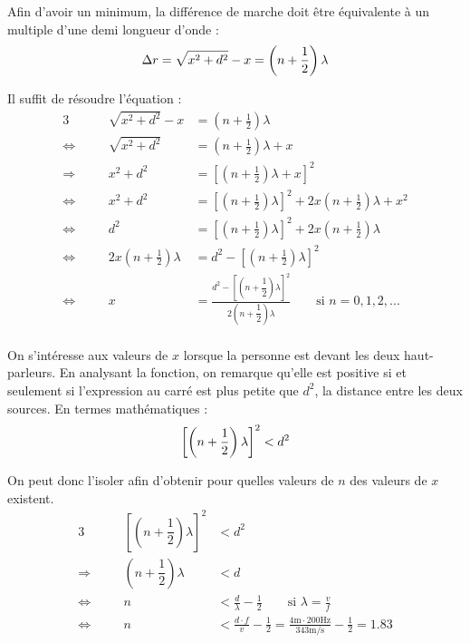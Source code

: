 \documentclass[11pt]{article}
\numberwithin{equation}{section}
\begin{document}
Afin d'avoir un minimum, la différence de marche doit être équivalente à un multiple d'une demi longueur d'onde :
\begin{equation*}
	\Delta r=\sqrt{x^2+d^2}-x=\left (n+\frac{1}{2}\right )\lambda\\
\end{equation*}

Il suffit de résoudre l'équation :
\begin{alignat*}{3}
	                     & & \sqrt{x^2+d^2}-x&=\left (n+\frac{1}{2}\right )\lambda\\
	\Leftrightarrow\quad & & \sqrt{x^2+d^2}  &=\left (n+\frac{1}{2}\right )\lambda+x\\
	\Rightarrow\quad     & &       x^2+d^2   &=\left [\left (n+\frac{1}{2}\right )\lambda+x\right ]^2\\
    \Leftrightarrow\quad & &       x^2+d^2   &=\left [\left (n+\frac{1}{2}\right )\lambda\right ]^2+2x\left (n+\frac{1}{2}\right )\lambda+x^2\\
    \Leftrightarrow\quad & &       d^2       &=\left [\left (n+\frac{1}{2}\right )\lambda\right ]^2+2x\left (n+\frac{1}{2}\right )\lambda\\
    \Leftrightarrow\quad & & 2x\left (n+\frac{1}{2}\right )\lambda&=d^2-\left [\left (n+\frac{1}{2}\right )\lambda\right ]^2\\
    \Leftrightarrow\quad & & x &=\frac{d^2-\left [\left (n+\dfrac{1}{2}\right )\lambda\right ]^2}{2\left (n+\dfrac{1}{2}\right )\lambda}\quad\quad\text{si $n=0,1,2,...$}\\
\end{alignat*}

On s'intéresse aux valeurs de $x$ lorsque la personne est devant les deux haut-parleurs. En analysant la fonction, on remarque qu'elle est positive si et seulement si l'expression au carré est plus petite que $d^2$, la distance entre les deux sources. En termes mathématiques :
\begin{equation*}
	\left [\left (n+\dfrac{1}{2}\right )\lambda\right ]^2<d^2\\
\end{equation*}

On peut donc l'isoler afin d'obtenir pour quelles valeurs de $n$ des valeurs de $x$ existent.
\begin{alignat*}{3}
	                     & & \left [\left (n+\dfrac{1}{2}\right )\lambda\right ]^2&<d^2\\
	\Rightarrow\quad     & &        \left (n+\dfrac{1}{2}\right )\lambda          &<d\\
	\Leftrightarrow\quad & &               n                                      &<\frac{d}{\lambda}-\frac{1}{2}\quad\quad\text{si $\lambda=\frac{v}{f}$}\\
	\Leftrightarrow\quad & &               n                                      &<\frac{d\cdot f}{v}-\frac{1}{2}=\frac{4\mathrm{m}\cdot 200\mathrm{Hz}}{343\mathrm{m/s}}-\frac{1}{2}=1.83\\
\end{alignat*}
\end{document}
